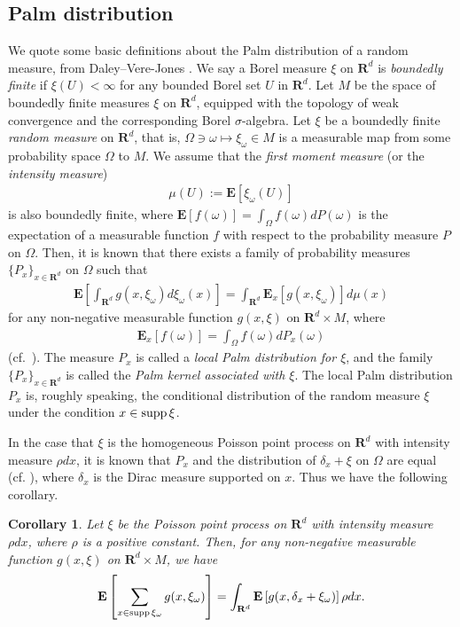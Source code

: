 \documentclass[12pt,a4paper]{article}
\newtheorem{corollary}[theorem]{Corollary}
\def\supp{\mathop{\rm supp}\nolimits}
\begin{document}
\subsection{Palm distribution}
\label{subsection_palm}
We quote some basic definitions
about the Palm distribution of a random measure,
from 
Daley--Vere-Jones \cite{Da-Ve2}.
We say a Borel measure $\xi$ on $\mathbf{R}^d$ is 
\textit{boundedly finite}
if $\xi(U)<\infty$ for any bounded Borel set $U$ in $\mathbf{R}^d$.
Let $M$
be the space of boundedly finite measures $\xi$ on $\mathbf{R}^d$,
equipped with the topology of weak convergence
and the corresponding Borel $\sigma$-algebra.
Let $\xi$ be a boundedly finite \textit{random measure} on $\mathbf{R}^d$,
that is,
$\Omega\ni \omega\mapsto \xi_\omega \in M$
is a measurable map
from some probability space $\Omega$
to $M$.
We assume that the \textit{first moment measure}
(or the \textit{intensity measure})
\begin{align*}
 \mu(U):=\mathbf{E}[\xi_\omega(U)]
\end{align*}
is also boundedly finite,
where $\mathbf{E}[f(\omega)]=\int_\Omega f(\omega) dP(\omega)$
is the expectation of a measurable function $f$
with respect to the probability measure $P$ on $\Omega$.
Then, it is known that
there exists
a family of probability measures $\{P_x\}_{x\in \mathbf{R}^d}$
on $\Omega$ such that 
\begin{align*}
\mathbf{E}\left[
\int_{\mathbf{R}^d}g(x,\xi_\omega)d\xi_\omega(x)
\right]
=
\int_{\mathbf{R}^d} 
\mathbf{E}_x
\left[
g(x,\xi_\omega)
\right]
d\mu(x)
\end{align*}
for any non-negative measurable
function $g(x,\xi)$
on $\mathbf{R}^d\times M$,
where
\begin{align*}
 \mathbf{E}_x[f(\omega)]=\int_\Omega f(\omega)dP_x(\omega)
\end{align*}
(cf.\ \cite[Proposition 13.1.IV]{Da-Ve2}).
The measure
$P_x$ is called a 
\textit{local Palm distribution for $\xi$},
and the family 
$\{P_x\}_{x\in \mathbf{R}^d}$
is called the \textit{Palm kernel associated with $\xi$}.
The local Palm distribution $P_x$ is,
roughly speaking,
the conditional distribution of 
the random measure $\xi$ 
under the condition $x\in \supp \xi$.

In the case that $\xi$ is 
the homogeneous Poisson point process on $\mathbf{R}^d$
with intensity measure $\rho dx$,
it is known that
$P_x$ and the distribution of $\delta_x + \xi$ on $\Omega$ 
are equal (cf. \cite[Proposition 13.1.VII]{Da-Ve2}),
where $\delta_x$ is the Dirac measure supported on $x$.
Thus we have the following corollary.
\begin{corollary}
 \label{corollaly_palm}
Let $\xi$ be the Poisson point process on $\mathbf{R}^d$
with intensity measure $\rho dx$, where $\rho$ is a positive constant.
Then, for any non-negative measurable function $g(x,\xi)$ 
on $\mathbf{R}^d\times M$,
we have
\begin{align}
\label{07_01}
 \mathbf{E}\left[\sum_{x\in \supp \xi_\omega}g(x,\xi_\omega)\right]
=
\int_{\mathbf{R}^d}
\mathbf{E}\left[g(x,\delta_x+\xi_\omega)\right]
\rho dx.
\end{align}
\end{corollary}
\end{document}
